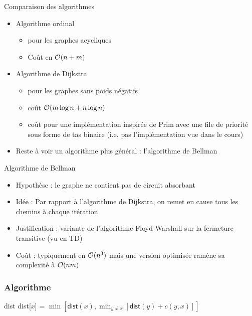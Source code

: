 


\begin{frame}{Comparaison des algorithmes}
    \begin{itemize}
        \item Algorithme ordinal 
        \begin{itemize}
            \item pour les graphes acycliques 
            \item Coût en ${\cal O}(n+m)$
        \end{itemize}
        \item Algorithme de Dijkstra 
        \begin{itemize}
            \item pour les graphes sans poids négatifs 
            \item coût ${\cal O}(m \log n + n \log n)$
            \item coût pour une implémentation inspirée de Prim avec une file de priorité sous forme de tas binaire (i.e. pas l'implémentation vue dans le cours)
        \end{itemize}
        \item Reste à voir un algorithme plus général : l'algorithme de Bellman 
    \end{itemize}
\end{frame}


\begin{frame}{Algorithme de Bellman}
    \begin{itemize}
        \item Hypothèse : le graphe ne contient pas de circuit absorbant
        \item Idée : Par rapport à l'algorithme de Dijkstra, on remet en cause tous les chemins à chaque itération 
        \item Justification : variante de l'algorithme Floyd-Warshall sur la fermeture transitive (vu en TD)
        \item Coût : typiquement en ${\cal O}(n^3)$ mais une version optimisée ramène sa complexité à ${\cal O}(nm)$
    \end{itemize}
\end{frame}

\begin{frame}[fragile]
    \frametitle{Algorithme}
    \begin{algorithmic}
            \State dist 
                    \State dist[$x$] = $\min [ \mathsf{dist}(x) , \min_{y \neq x} [ \mathsf{dist}(y) + c(y,x)]]$ 
                \EndFor
            \EndFor 
            \EndFunction        
    \end{algorithmic}
\end{frame}






